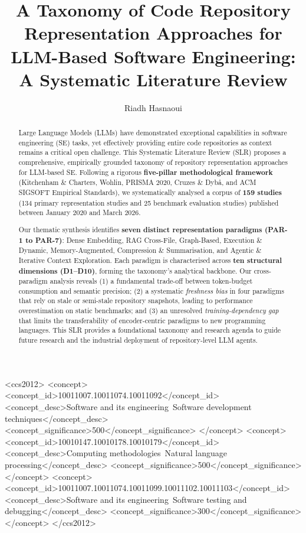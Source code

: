 \documentclass[acmsmall,screen,review]{acmart}
\begin{document}
\title{A Taxonomy of Code Repository Representation Approaches for
  LLM-Based Software Engineering: A Systematic Literature Review}

\author{Riadh Hasnaoui}

\begin{abstract}
Large Language Models (LLMs) have demonstrated exceptional capabilities
in software engineering (SE) tasks, yet effectively providing entire
code repositories as context remains a critical open challenge. This
Systematic Literature Review (SLR) proposes a comprehensive, empirically
grounded taxonomy of repository representation approaches for LLM-based
SE. Following a rigorous \textbf{five-pillar methodological framework}
(Kitchenham \& Charters, Wohlin, PRISMA 2020, Cruzes \& Dyb\aa{}, and
ACM SIGSOFT Empirical Standards), we systematically analysed a corpus
of \textbf{159 studies} (134 primary representation studies and 25
benchmark evaluation studies) published between January 2020 and
March 2026.

Our thematic synthesis identifies \textbf{seven distinct representation
paradigms (PAR-1 to PAR-7)}: Dense Embedding, RAG Cross-File,
Graph-Based, Execution \& Dynamic, Memory-Augmented, Compression \&
Summarisation, and Agentic \& Iterative Context Exploration. Each
paradigm is characterised across \textbf{ten structural dimensions
(D1–D10)}, forming the taxonomy's analytical backbone. Our
cross-paradigm analysis reveals (1) a fundamental trade-off between
token-budget consumption and semantic precision; (2) a systematic
\emph{freshness bias} in four paradigms that rely on stale or
semi-stale repository snapshots, leading to performance overestimation
on static benchmarks; and (3) an unresolved \emph{training-dependency
gap} that limits the transferability of encoder-centric paradigms to new
programming languages. This SLR provides a foundational taxonomy and
research agenda to guide future research and the industrial deployment
of repository-level LLM agents.
\end{abstract}

\begin{CCSXML}
<ccs2012>
 <concept>
  <concept_id>10011007.10011074.10011092</concept_id>
  <concept_desc>Software and its engineering~Software development
   techniques</concept_desc>
  <concept_significance>500</concept_significance>
 </concept>
 <concept>
  <concept_id>10010147.10010178.10010179</concept_id>
  <concept_desc>Computing methodologies~Natural language
   processing</concept_desc>
  <concept_significance>500</concept_significance>
 </concept>
 <concept>
  <concept_id>10011007.10011074.10011099.10011102.10011103</concept_id>
  <concept_desc>Software and its engineering~Software testing and
   debugging</concept_desc>
  <concept_significance>300</concept_significance>
 </concept>
</ccs2012>
\end{CCSXML}
\end{document}
